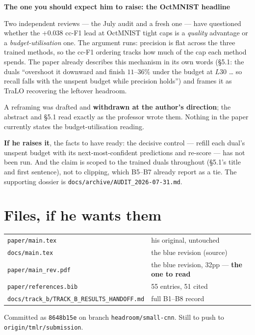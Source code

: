 \documentclass[11pt,a4paper]{article}
\newenvironment{callout}[1]
  {\par\medskip\noindent\begin{lrbox}{\calloutbox}%
   \begin{minipage}{\dimexpr\linewidth-20pt\relax}%
   \textbf{#1}\par\smallskip}
  {\end{minipage}\end{lrbox}%
   \setlength{\fboxsep}{10pt}%
   \colorbox{boxgrey}{\usebox{\calloutbox}}\par\medskip}
\begin{document}
\begin{callout}{The one you should expect him to raise: the OctMNIST headline}
Two independent reviews --- the July audit and a fresh one --- have questioned whether the
$+0.038$ cc-F1 lead at OctMNIST tight caps is a \emph{quality} advantage or a
\emph{budget-utilisation} one. The argument runs: precision is flat across the three
trained methods, so the cc-F1 ordering tracks how much of the cap each method spends. The
paper already describes this mechanism in its own words (\S5.1: the duals ``overshoot it
downward and finish $11$--$36\%$ under the budget at $L30$ \ldots{} so recall falls with
the unspent budget while precision holds'') and frames it as TraLO recovering the leftover
headroom.

\smallskip
A reframing was drafted and \textbf{withdrawn at the author's direction}; the abstract and
\S5.1 read exactly as the professor wrote them. Nothing in the paper currently states the
budget-utilisation reading.

\smallskip
\textbf{If he raises it}, the facts to have ready: the decisive control --- refill each
dual's unspent budget with its next-most-confident predictions and re-score --- has not
been run. And the claim is scoped to the trained duals throughout (\S5.1's title and first
sentence), not to clipping, which B5--B7 already report as a tie. The supporting dossier
is \texttt{docs/archive/AUDIT\_2026-07-31.md}.
\end{callout}

\section{Files, if he wants them}

\begin{center}\small
\begin{tabular}{ll}
\toprule
\texttt{paper/main.tex} & his original, untouched \\
\texttt{docs/main.tex} & the blue revision (source) \\
\texttt{paper/main\_rev.pdf} & the blue revision, 32pp --- \textbf{the one to read} \\
\texttt{paper/references.bib} & 55 entries, 51 cited \\
\texttt{docs/track\_b/TRACK\_B\_RESULTS\_HANDOFF.md} & full B1--B8 record \\
\bottomrule
\end{tabular}
\end{center}

\vspace{6pt}
\noindent\small Committed as \texttt{8648b15e} on branch \texttt{headroom/small-cnn}.
Still to push to \texttt{origin/tmlr/submission}.
\end{document}

